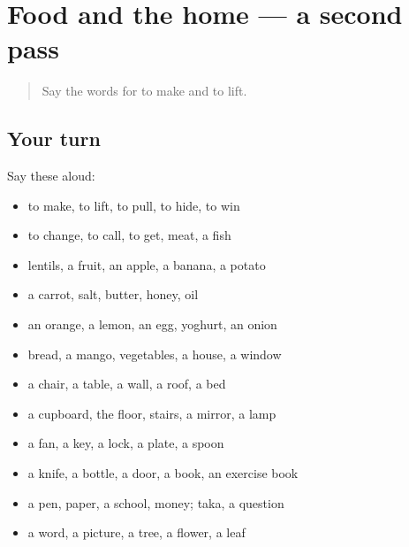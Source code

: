 \section[(dialogue)]{Food and the home — a second pass}

\label{lesson:BN-R65-second-pass-food-and-the-home}



\begin{quote}
Say the words for to make and to lift.
\end{quote}

\subsection*{Your turn}
Say these aloud:

\begin{itemize}
\raggedright
  \item to make, to lift, to pull, to hide, to win
  \item to change, to call, to get, meat, a fish
  \item lentils, a fruit, an apple, a banana, a potato
  \item a carrot, salt, butter, honey, oil
  \item an orange, a lemon, an egg, yoghurt, an onion
  \item bread, a mango, vegetables, a house, a window
  \item a chair, a table, a wall, a roof, a bed
  \item a cupboard, the floor, stairs, a mirror, a lamp
  \item a fan, a key, a lock, a plate, a spoon
  \item a knife, a bottle, a door, a book, an exercise book
  \item a pen, paper, a school, money; taka, a question
  \item a word, a picture, a tree, a flower, a leaf
\end{itemize}

